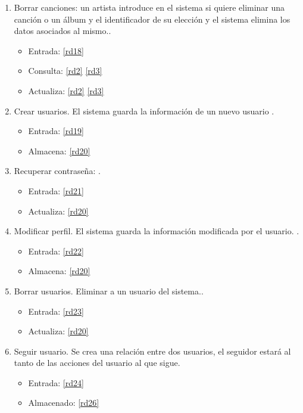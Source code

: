 \documentclass[12pt,a4paper]{article}
\begin{document}
\begin{enumerate}[label=\textnormal{RF\arabic*.}]
	 \item Borrar canciones: un artista introduce en el sistema si quiere eliminar una canción o un álbum y el identificador de su elección y el sistema elimina los datos asociados al mismo.\label{rf11}.
    	\begin{itemize}
			\item Entrada: \ref{rd18}
			\item Consulta: \ref{rd2} \ref{rd3} 
			\item Actualiza: \ref{rd2} \ref{rd3} 
		\end{itemize}
		
		
	 \item Crear usuarios. El sistema guarda la información de un nuevo usuario \label{rf12}.
    	\begin{itemize}
			\item Entrada: \ref{rd19}
			\item Almacena: \ref{rd20}
		\end{itemize}
		
	 \item Recuperar contraseña: \label{rf13}.
    	\begin{itemize}
			\item Entrada: \ref{rd21}
			\item Actualiza: \ref{rd20}
		\end{itemize}
		
	 \item Modificar perfil. El sistema guarda la información modificada por el usuario. \label{rf14}.
    	\begin{itemize}
			\item Entrada: \ref{rd22}
			\item Almacena: \ref{rd20}
		\end{itemize}
		
	 \item Borrar usuarios. Eliminar a un usuario del sistema.\label{rf15}.
    	\begin{itemize}
			\item Entrada: \ref{rd23}
			\item Actualiza: \ref{rd20}
		\end{itemize}
		
		
	 \item Seguir usuario. Se crea una relación entre dos usuarios, el seguidor estará al tanto de las acciones del usuario al que sigue. \label{rf16}
	 	\begin{itemize}
			\item Entrada: \ref{rd24}
			\item Almacenado: \ref{rd26}
		\end{itemize}
	

\end{enumerate}
\end{document}
